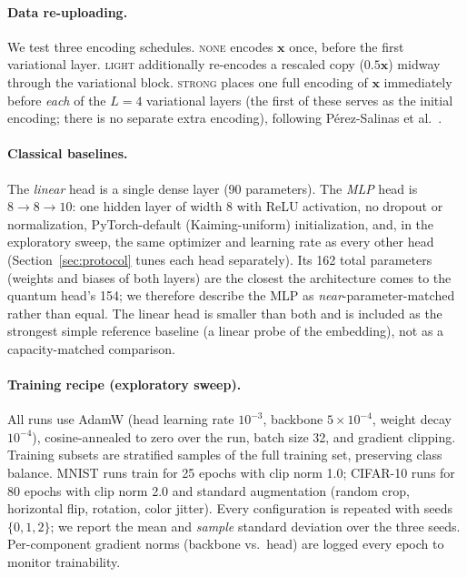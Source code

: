 \documentclass[10pt]{article}
\begin{document}
\paragraph{Data re-uploading.}
We test three encoding schedules. \textsc{none} encodes $\mathbf{x}$ once,
before the first variational layer. \textsc{light} additionally re-encodes a
rescaled copy ($0.5\mathbf{x}$) midway through the variational block.
\textsc{strong} places one full encoding of $\mathbf{x}$ immediately before
\emph{each} of the $L=4$ variational layers (the first of these serves as the
initial encoding; there is no separate extra encoding), following
P\'{e}rez-Salinas et al.~\citep{perez2020data}.

\paragraph{Classical baselines.}
The \emph{linear} head is a single dense layer (90 parameters). The \emph{MLP}
head is $8 \to 8 \to 10$: one hidden layer of width 8 with ReLU activation, no
dropout or normalization, PyTorch-default (Kaiming-uniform) initialization,
and, in the exploratory sweep, the same optimizer and learning rate as every
other head (Section~\ref{sec:protocol} tunes each head separately). Its 162 total parameters (weights and biases of both layers) are
the closest the architecture comes to the quantum head's 154; we therefore
describe the MLP as \emph{near}-parameter-matched rather than equal. The
linear head is smaller than both and is included as the strongest simple
reference baseline (a linear probe of the embedding), not as a
capacity-matched comparison.

\paragraph{Training recipe (exploratory sweep).}
All runs use AdamW (head learning rate $10^{-3}$, backbone $5\times10^{-4}$,
weight decay $10^{-4}$), cosine-annealed to zero over the run, batch size 32,
and gradient clipping. Training subsets are stratified samples of the full
training set, preserving class balance. MNIST runs train for 25 epochs with
clip norm 1.0; CIFAR-10 runs for 80 epochs with clip norm 2.0 and standard
augmentation (random crop, horizontal flip, rotation, color jitter). Every
configuration is repeated with seeds $\{0, 1, 2\}$; we report the mean and
\emph{sample} standard deviation over the three seeds. Per-component gradient
norms (backbone vs.\ head) are logged every epoch to monitor trainability.
\end{document}
